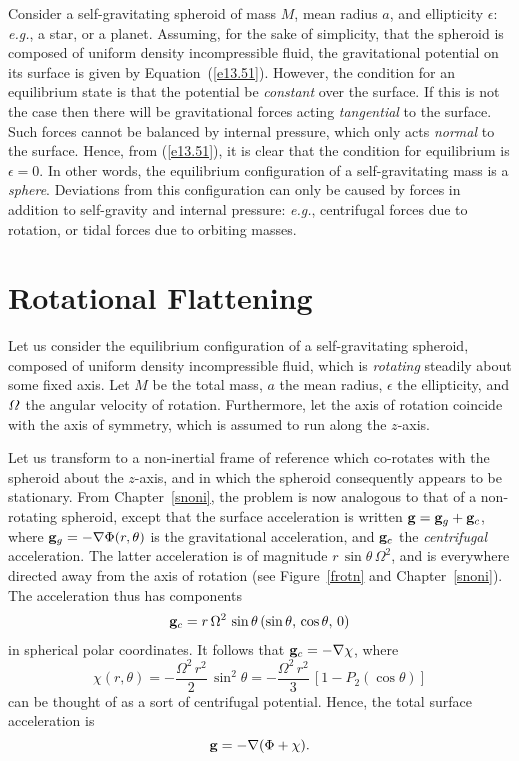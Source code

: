 Consider a self-gravitating spheroid of mass $M$, mean radius $a$, and ellipticity $\epsilon$: {\em e.g.}, a star, or a planet. Assuming, for the sake of simplicity, that the
spheroid is composed of uniform density incompressible fluid, the gravitational potential on its surface is
given by Equation~(\ref{e13.51}). However, the condition for an equilibrium
state is that the potential be {\em constant}\/ over the surface. If this is not
the case then there will be gravitational forces acting {\em tangential}\/ to the
surface. Such forces cannot be balanced by internal pressure, which only
acts {\em normal}\/ to the surface. Hence, from (\ref{e13.51}), it is clear that the
condition for equilibrium is $\epsilon=0$. In other words, the equilibrium
configuration  of a self-gravitating mass is a {\em sphere}. Deviations
from this configuration can only be caused by forces in addition to self-gravity
and internal pressure: {\em e.g.}, centrifugal forces due to rotation, or tidal
forces due to orbiting masses.

\section{Rotational Flattening}\label{srotf}
Let us consider the equilibrium configuration of a self-gravitating spheroid,
composed of uniform density incompressible fluid, which is {\em rotating}\/
steadily
about some fixed axis. Let $M$ be the total mass, $a$ the mean radius,
$\epsilon$ the ellipticity, and ${\mit\Omega}$ the angular velocity of rotation. Furthermore, let the axis of rotation coincide with the axis of symmetry, which is assumed to run along the $z$-axis.

Let us transform to a non-inertial frame of reference which co-rotates with the spheroid about the $z$-axis, and in which the spheroid consequently appears to be stationary. From Chapter~\ref{snoni},
the problem is now analogous to that of a non-rotating spheroid, except that
the surface acceleration  is written ${\bf g} = {\bf g}_g + {\bf g}_c$,
where ${\bf g}_g=-\nabla\Phi(r,\theta)$ is the gravitational acceleration, and
${\bf g}_c$ the {\em centrifugal}\/ acceleration. The latter acceleration
is of magnitude $r\,\sin\theta\,\Omega^2$, and is everywhere directed
away from the axis of rotation (see Figure~\ref{frotn} and Chapter~\ref{snoni}).
The acceleration thus has components 
\begin{eqnarray}
{\bf g}_c = r\,\Omega^2\,\sin\theta\,(\sin\theta,\,\cos\theta,\,0)
\end{eqnarray}
in spherical polar coordinates. It follows that ${\bf g}_c = - \nabla\chi$,
where
\begin{equation}\label{e13.53}
\chi(r,\theta) = - \frac{\Omega^2\,r^2}{2}\,\sin^2\theta= -\frac{\Omega^2\,r^2}{3}\,\left[1-P_2(\cos\theta)\right]
\end{equation}
can be thought of as a sort of centrifugal potential. Hence, the
total surface acceleration is
\begin{equation}
{\bf g} = - \nabla(\Phi+\chi).
\end{equation}

